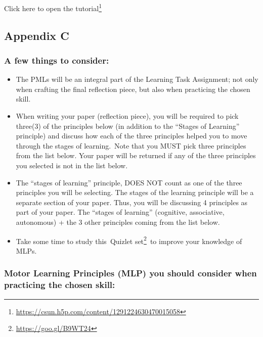 \documentclass[
  letterpaper,
  DIV=11,
  numbers=noendperiod]{scrartcl}
\providecommand{\tightlist}{%
  \setlength{\itemsep}{0pt}\setlength{\parskip}{0pt}}\usepackage{longtable,booktabs,array}
\DeclareRobustCommand{\href}[2]{#2\footnote{\url{#1}}}
\begin{document}
\href{https://csun.h5p.com/content/1291224630470015058}{Click here to
open the tutorial}

\hypertarget{sec-appendix-c}{%
\subsection{Appendix C}\label{sec-appendix-c}}

\hypertarget{a-few-things-to-consider-1}{%
\subsubsection{\texorpdfstring{\textbf{A few things to
consider:}}{A few things to consider:}}\label{a-few-things-to-consider-1}}

\begin{itemize}
\tightlist
\item
  The PMLs will be an integral part of the Learning Task Assignment; not
  only when crafting the final reflection piece, but also when
  practicing the chosen skill.
\item
  When writing your paper (reflection piece), you will be required to
  pick three(3) of the principles below (in addition to the ``Stages of
  Learning'' principle) and discuss how each of the three principles
  helped you to move through the stages of learning.~Note that you MUST
  pick three principles from the list below. Your paper will be returned
  if any of the three principles you selected is not in the list below.
\item
  The ``stages of learning'' principle, DOES NOT count as one of the
  three principles you will be selecting. The stages of the learning
  principle will be a separate section of your paper. Thus, you will be
  discussing 4 principles as part of your paper. The ``stages of
  learning'' (cognitive, associative, autonomous) + the 3 other
  principles coming from the list below.
\item
  Take some time to study this~\href{https://goo.gl/B9WT24}{Quizlet
  set}~to improve your knowledge of MLPs.
\end{itemize}

\hypertarget{motor-learning-principles-mlp-you-should-consider-when-practicing-the-chosen-skill}{%
\subsubsection{\texorpdfstring{\textbf{Motor Learning Principles (MLP)
you should consider when practicing the chosen
skill:}}{Motor Learning Principles (MLP) you should consider when practicing the chosen skill:}}\label{motor-learning-principles-mlp-you-should-consider-when-practicing-the-chosen-skill}}
\end{document}
